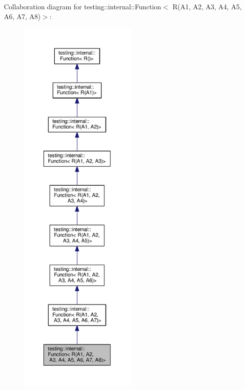 Collaboration diagram for testing\+:\+:internal\+:\+:Function$<$ R(A1, A2, A3, A4, A5, A6, A7, A8)$>$\+:
\nopagebreak
\begin{figure}[H]
\begin{center}
\leavevmode
\includegraphics[height=550pt]{structtesting_1_1internal_1_1Function_3_01R_07A1_00_01A2_00_01A3_00_01A4_00_01A5_00_01A6_00_01A7_00_01A8_08_4__coll__graph}
\end{center}
\end{figure}
